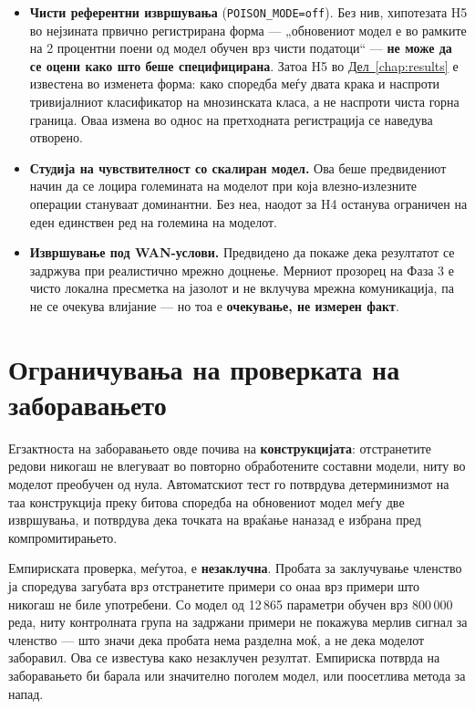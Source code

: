 \begin{itemize}
  \item \textbf{Чисти референтни извршувања} (\texttt{POISON\_MODE=off}). Без нив, хипотезата H5 во нејзината првично регистрирана форма --- „обновениот модел е во рамките на 2 процентни поени од модел обучен врз чисти податоци“ --- \textbf{не може да се оцени како што беше специфицирана}. Затоа H5 во \hyperref[chap:results]{Дел~\ref*{chap:results}} е известена во изменета форма: како споредба меѓу двата крака и наспроти тривијалниот класификатор на мнозинската класа, а не наспроти чиста горна граница. Оваа измена во однос на претходната регистрација се наведува отворено.
  \item \textbf{Студија на чувствителност со скалиран модел.} Ова беше предвидениот начин да се лоцира големината на моделот при која влезно-излезните операции стануваат доминантни. Без неа, наодот за H4 останува ограничен на еден единствен ред на големина на моделот.
  \item \textbf{Извршување под WAN-услови.} Предвидено да покаже дека резултатот се задржува при реалистично мрежно доцнење. Мерниот прозорец на Фаза 3 е чисто локална пресметка на јазолот и не вклучува мрежна комуникација, па не се очекува влијание --- но тоа е \textbf{очекување, не измерен факт}.
\end{itemize}

\section{Ограничувања на проверката на заборавањето}

Егзактноста на заборавањето овде почива на \textbf{конструкцијата}: отстранетите редови
никогаш не влегуваат во повторно обработените составни модели, ниту во моделот преобучен од
нула. Автоматскиот тест го потврдува детерминизмот на таа конструкција преку битова
споредба на обновениот модел меѓу две извршувања, и потврдува дека точката на враќање
наназад е избрана пред компромитирањето.

Емпириската проверка, меѓутоа, е \textbf{незаклучна}. Пробата за заклучување членство ја
споредува загубата врз отстранетите примери со онаа врз примери што никогаш не биле
употребени. Со модел од 12\,865 параметри обучен врз 800\,000 реда, ниту контролната група на
задржани примери не покажува мерлив сигнал за членство --- што значи дека пробата нема
разделна моќ, а не дека моделот заборавил. Ова се известува како незаклучен резултат.
Емпириска потврда на заборавањето би барала или значително поголем модел, или
поосетлива метода за напад.

